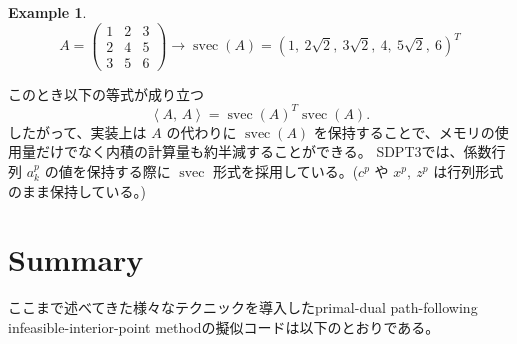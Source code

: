 \documentclass{jsarticle}
\newtheorem{example}{Example}
\newcommand{\inprod}[2]{\left\langle #1, \, #2 \right\rangle}
\begin{document}
\begin{example}
\[A = \begin{pmatrix}
    1 & 2 & 3\\
    2 & 4 & 5\\
    3 & 5 & 6
\end{pmatrix} \rightarrow \operatorname{svec}(A) = (1, ~ 2\sqrt{2}, ~ 3\sqrt{2}, ~ 4, ~ 5\sqrt{2}, ~ 6)^T\]
\end{example}

このとき以下の等式が成り立つ
\[\inprod{A}{A} = \operatorname{svec}(A)^T \operatorname{svec}(A).\]
したがって、実装上は $A$ の代わりに $\operatorname{svec}(A)$ を保持することで、メモリの使用量だけでなく内積の計算量も約半減することができる。
SDPT3では、係数行列 $a^p_k$ の値を保持する際に $\operatorname{svec}$ 形式を採用している。($c^p$ や $x^p, ~ z^p$ は行列形式のまま保持している。)


\section{Summary}
ここまで述べてきた様々なテクニックを導入したprimal-dual path-following infeasible-interior-point methodの擬似コードは以下のとおりである。
\end{document}
